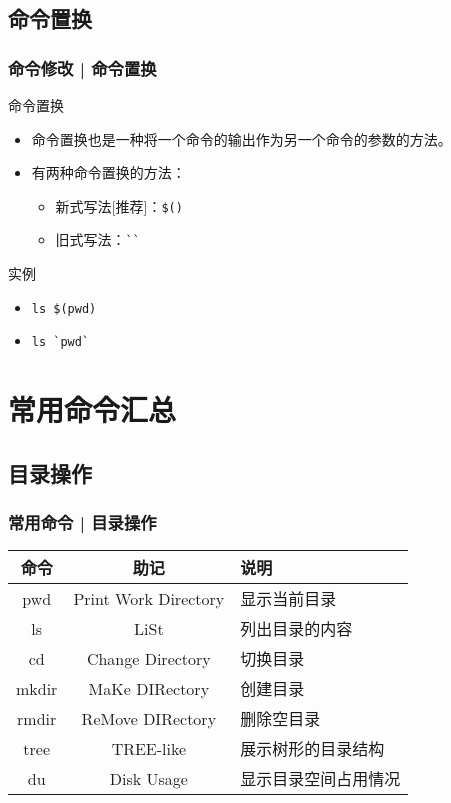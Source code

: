 \subsection{命令置换}
\begin{frame}[fragile]
  \frametitle{命令修改 | \alert{命令置换}}
  \begin{block}{命令置换}
    \begin{itemize}
      \item 命令置换也是一种将一个命令的输出作为另一个命令的参数的方法。
      \item 有两种命令置换的方法：
	\begin{itemize}
	  \item 新式写法[推荐]：\verb|$()|
	  \item 旧式写法：\verb|``|
	\end{itemize}
    \end{itemize}
  \end{block}
  \pause
  \begin{block}{实例}
    \begin{itemize}[<+->]
      \item \verb|ls $(pwd)|
      \item \verb|ls `pwd`|
    \end{itemize}
  \end{block}
\end{frame}

\section{常用命令汇总}
\subsection{目录操作}
\begin{frame}
  \frametitle{常用命令 | \alert{目录操作}}
  \begin{table}
    \centering
    \begin{tabular}{ccl}
      \hline
      \rowcolor{blue!50}命令 & 助记 & 说明\\
      \hline
      pwd & Print Work Directory & 显示当前目录\\
      ls & LiSt & 列出目录的内容\\
      cd & Change Directory & 切换目录\\
      mkdir & MaKe DIRectory & 创建目录\\
      rmdir & ReMove DIRectory & 删除空目录\\
      tree & TREE-like & 展示树形的目录结构\\
      du & Disk Usage & 显示目录空间占用情况\\
      \hline
    \end{tabular}
  \end{table}
\end{frame}

